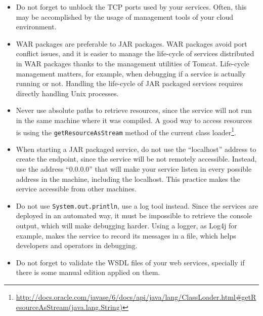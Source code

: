\documentclass[a4paper, 10pt]{article}
\begin{document}
\begin{itemize}

\item Do not forget to unblock the TCP ports used by your services. Often, this may be accomplished by the usage of management tools of your cloud environment.

\item WAR packages are preferable to JAR packages. WAR packages avoid port conflict issues, and it is easier to manage the life-cycle of services distributed in WAR packages thanks to the management utilities of Tomcat. Life-cycle management matters, for example, when debugging if a service is actually running or not. Handling the life-cycle of JAR packaged services requires directly handling Unix processes.

\item Never use absolute paths to retrieve resources, since the service will not run in the same machine where it was compiled. A good way to access resources is using the \texttt{getResourceAsStream} method of the current class loader\footnote{\url{http://docs.oracle.com/javase/6/docs/api/java/lang/ClassLoader.html\#getResourceAsStream(java.lang.String)}}.

\item When starting a JAR packaged service, do not use the ``localhost'' address to create the endpoint, since the service will be not remotely accessible. Instead, use the address ``0.0.0.0'' that will make your service listen in every possible address in the machine, including the localhost. This practice makes the service accessible from other machines.

\item Do not use \texttt{System.out.println}, use a log tool instead. Since the services are deployed in an automated way, it must be impossible to retrieve the console output, which will make debugging harder. Using a logger, as Log4j for example, makes the service to record its messages in a file, which helps developers and operators in debugging.

\item Do not forget to validate the WSDL files of your web services, specially if there is some manual edition applied on them.


\end{itemize}
\end{document}
